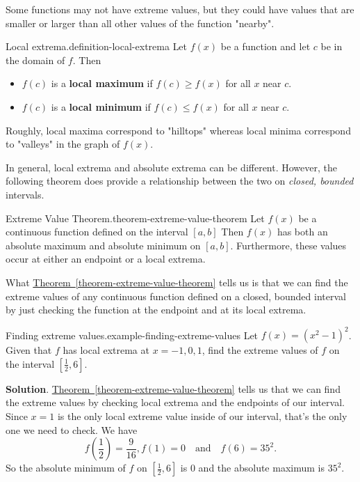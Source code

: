 \documentclass[10pt,]{book}
\newcommand{\terminology}[1]{\textbf{#1}}
\numberwithin{equation}{section}
\begin{document}
Some functions may not have extreme values, but they could have values that are smaller or larger than all other values of the function "nearby".%
\begin{definition}{Local extrema.}{definition-local-extrema}%
\hypertarget{p-313}{}%
Let \(f(x)\) be a function and let \(c\) be in the domain of \(f\). Then \leavevmode%
\begin{itemize}[label=\textbullet]
\item{}\(f(c)\) is a \terminology{local maximum} if \(f(c)\geq f(x)\) for all \(x\) near \(c\).%
\item{}\(f(c)\) is a \terminology{local minimum} if \(f(c)\leq f(x)\) for all \(x\) near \(c\).%
\end{itemize}
 Roughly, local maxima correspond to "hilltops" whereas local minima correspond to "valleys" in the graph of \(f(x)\).%
\end{definition}
\hypertarget{p-314}{}%
In general, local extrema and absolute extrema can be different. However, the following theorem does provide a relationship between the two on \emph{closed, bounded} intervals.%
\begin{theorem}{Extreme Value Theorem.}{}{theorem-extreme-value-theorem}%
\hypertarget{p-315}{}%
Let \(f(x)\) be a continuous function defined on the interval \([a,b]\) Then \(f(x)\) has both an absolute maximum and absolute minimum on \([a,b]\). Furthermore, these values occur at either an endpoint or a local extrema.%
\end{theorem}
\hypertarget{p-316}{}%
What \hyperref[theorem-extreme-value-theorem]{Theorem~\ref{theorem-extreme-value-theorem}} tells us is that we can find the extreme values of any continuous function defined on a closed, bounded interval by just checking the function at the endpoint and at its local extrema.%
\begin{example}{Finding extreme values.}{example-finding-extreme-values}%
\hypertarget{p-317}{}%
Let \(f(x) = (x^{2}-1)^{2}\). Given that \(f\) has local extrema at \(x=-1,0,1\), find the extreme values of \(f\) on the interval \([\frac{1}{2},6]\).%
\par\smallskip%
\noindent\textbf{Solution}.\hypertarget{solution-70}{}\quad%
\hypertarget{p-318}{}%
\hyperref[theorem-extreme-value-theorem]{Theorem~\ref{theorem-extreme-value-theorem}} tells us that we can find the extreme values by checking local extrema and the endpoints of our interval. Since \(x=1\) is the only local extreme value inside of our interval, that's the only one we need to check. We have%
\begin{equation*}
f(\frac{1}{2}) = \frac{9}{16}, f(1) = 0\quad\text{and}\quad f(6) = 35^{2}.
\end{equation*}
So the absolute minimum of \(f\) on \([\frac{1}{2},6]\) is \(0\) and the absolute maximum is \(35^{2}.\)%
\end{example}
\end{document}

